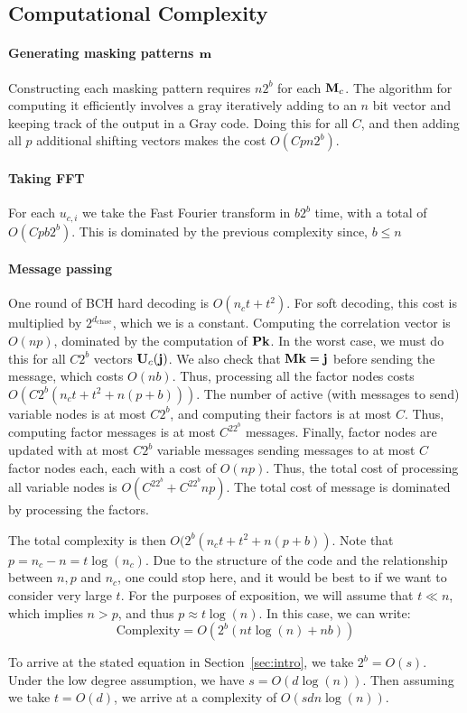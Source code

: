 \subsection{Computational Complexity}

\paragraph{Generating masking patterns $\mathbf m$} Constructing each masking pattern requires $n2^b$ for each $\mathbf M_c$. The algorithm for computing it efficiently involves a gray iteratively adding to an $n$ bit vector and keeping track of the output in a Gray code. Doing this for all $C$, and then adding all $p$ additional shifting vectors makes the cost $O(Cpn2^b)$.

\paragraph{Taking FFT} For each $u_{c,i}$ we take the Fast Fourier transform in $b2^b$ time, with a total of $O(Cpb2^b)$. This is dominated by the previous complexity since, $b \leq n$

\paragraph{Message passing} One round of BCH hard decoding is $O(n_ct + t^2)$. For soft decoding, this cost is multiplied by $2^{d_{\text{chase}}}$, which we is a constant.  Computing the correlation vector is $O(np)$, dominated by the computation of $\mathbf P \mathbf k$. In the worst case, we must do this for all $C 2^b$ vectors $\mathbf U_c(\mathbf j)$. We also check that $\mathbf M \mathbf k = \mathbf j$ before sending the message, which costs $O(nb)$. Thus, processing all the factor nodes costs $O(C2^b(n_c t + t^2 + n(p+b)))$. The number of active (with messages to send) variable nodes is at most $C2^b$, and computing their factors is at most $C$. Thus, computing factor messages is at most $C^22^b$ messages. Finally, factor nodes are updated with at most $C2^b$ variable messages sending messages to at most $C$ factor nodes each, each with a cost of $O(np)$. Thus, the total cost of processing all variable nodes is $O(C^22^b + C^22^bnp)$. The total cost of message is dominated by processing the factors. 

The total complexity is then $O(2^b(n_c t + t^2 + n(p + b))$.
Note that $p = n_c - n = t \log(n_c)$. Due to the structure of the code and the relationship between $n,p$ and $n_c$, one could stop here, and it would be best to if we want to consider very large $t$. For the purposes of exposition, we will assume that $t \ll n$, which implies $n > p$, and thus $p \approx t \log(n)$. In this case, we can write:
\begin{equation}
    \text{Complexity} = O(2^b(nt\log(n)  + nb))
\end{equation}

To arrive at the stated equation in Section~\ref{sec:intro}, we take $2^b = O(s)$. Under the low degree assumption, we have $s = O(d\log(n))$. Then assuming we take $t= O(d)$, we arrive at a complexity of $O(sdn\log(n))$.